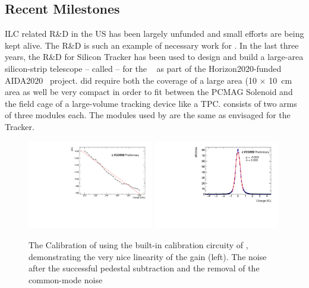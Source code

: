 \subsection{Recent Milestones}
ILC related R\&D in the US has been largely unfunded and small efforts are being kept alive. The \KPIX R\&D is such an example of necessary work for \SID.
In the last three years, the R\&D for \KPIX Silicon Tracker has been used to design and build a large-area silicon-strip 
telescope -- called \LYCORIS -- for the \DIITBF~\cite{desytb2018} as part of the Horizon2020-funded AIDA2020~\cite{AIDA2020} project.
\LYCORIS did require both the coverage of a large area (10 $\times$ \SI{10}{\centi\meter} area as well be very compact in order to fit
between the PCMAG Solenoid and the field cage of a large-volume tracking device like a TPC. \LYCORIS consists of two arms of three modules each. The modules used by \LYCORIS are 
the same as envisaged for the \SID Tracker.

\begin{figure}[htbp]
\includegraphics[width=0.49\textwidth]{Tracker/KPIX/KPIX_Calib_DAC_c0_k0_b0_r0.pdf}
\includegraphics[width=0.49\textwidth]{Tracker/KPIX/KPIX_Gaussian_charge_corr_k0_b0.pdf}
\caption{The Calibration of \LYCORIS using the built-in calibration circuity of \KPIX, demonstrating the very nice linearity of the \KPIX gain (left). The \KPIX noise after the 
successful pedestal subtraction and the removal of the common-mode noise}
\label{fig:SiliconTracking:KPIX:Calibration}
\end{figure}

